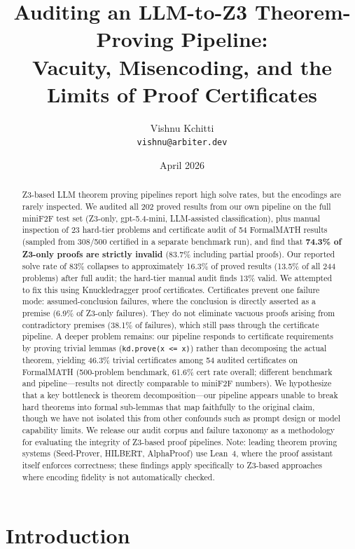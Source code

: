 \documentclass[11pt]{article}
\title{\textbf{Auditing an LLM-to-Z3 Theorem-Proving Pipeline:\\Vacuity, Misencoding, and the Limits of Proof Certificates}}
\author{
  Vishnu Kchitti\\
  \texttt{vishnu@arbiter.dev}
}
\date{April 2026}
\begin{document}
\maketitle

\begin{abstract}
Z3-based LLM theorem proving pipelines report high solve rates, but the encodings are rarely inspected. We audited all 202 proved results from our own pipeline on the full miniF2F test set (Z3-only, gpt-5.4-mini, LLM-assisted classification), plus manual inspection of 23 hard-tier problems and certificate audit of 54 FormalMATH results (sampled from 308/500 certified in a separate benchmark run), and find that \textbf{74.3\% of Z3-only proofs are strictly invalid} (83.7\% including partial proofs). Our reported solve rate of 83\% collapses to approximately 16.3\% of proved results (13.5\% of all 244 problems) after full audit; the hard-tier manual audit finds 13\% valid. We attempted to fix this using Knuckledragger proof certificates. Certificates prevent one failure mode: assumed-conclusion failures, where the conclusion is directly asserted as a premise (6.9\% of Z3-only failures). They do not eliminate vacuous proofs arising from contradictory premises (38.1\% of failures), which still pass through the certificate pipeline. A deeper problem remains: our pipeline responds to certificate requirements by proving trivial lemmas (\texttt{kd.prove(x <= x)}) rather than decomposing the actual theorem, yielding 46.3\% trivial certificates among 54 audited certificates on FormalMATH (500-problem benchmark, 61.6\% cert rate overall; different benchmark and pipeline---results not directly comparable to miniF2F numbers). We hypothesize that a key bottleneck is theorem decomposition---our pipeline appears unable to break hard theorems into formal sub-lemmas that map faithfully to the original claim, though we have not isolated this from other confounds such as prompt design or model capability limits. We release our audit corpus and failure taxonomy as a methodology for evaluating the integrity of Z3-based proof pipelines. Note: leading theorem proving systems (Seed-Prover, HILBERT, AlphaProof) use Lean~4, where the proof assistant itself enforces correctness; these findings apply specifically to Z3-based approaches where encoding fidelity is not automatically checked.
\end{abstract}

\section{Introduction}\label{sec:intro}
\end{document}
